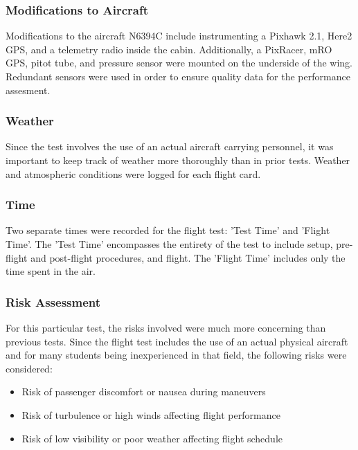 \documentclass[conf]{new-aiaa}
\begin{document}
\medskip


\subsubsection{Modifications to Aircraft}

Modifications to the aircraft N6394C include instrumenting a Pixhawk 2.1, Here2 GPS, and a telemetry radio inside the cabin. Additionally, a PixRacer, mRO GPS, pitot tube, and pressure sensor were mounted on the underside of the wing. Redundant sensors were used in order to ensure quality data for the performance assesment.

\subsubsection{Weather}

Since the test involves the use of an actual aircraft carrying personnel, it was important to keep track of weather more thoroughly than in prior tests. Weather and atmospheric conditions were logged for each flight card.


\subsubsection{Time}

Two separate times were recorded for the flight test: 'Test Time' and 'Flight Time'. The 'Test Time' encompasses the entirety of the test to include setup, pre-flight and post-flight procedures, and flight. The 'Flight Time' includes only the time spent in the air.

\subsubsection{Risk Assessment}

For this particular test, the risks involved were much more concerning than previous tests. Since the flight test includes the use of an actual physical aircraft and for many students being inexperienced in that field, the following risks were considered:

\medskip
\begin{itemize}
\item Risk of passenger discomfort or nausea during maneuvers
\item Risk of turbulence or high winds affecting flight performance
\item Risk of low visibility or poor weather affecting flight schedule
\end{itemize}
\end{document}
